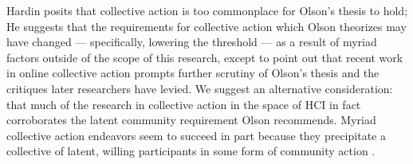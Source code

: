 \documentclass{sigchi-ext}
\begin{document}
Hardin posits that collective action is too commonplace for Olson's thesis to hold;
He suggests that the requirements for collective action which Olson theorizes may have changed
--- specifically, lowering the threshold ---
as a result of myriad factors outside of the scope of this research, except to point out that recent work in online collective action prompts further scrutiny of Olson's thesis and the critiques later researchers have levied.
We suggest an alternative consideration: that much of the research in collective action in the space of HCI in fact corroborates the latent community requirement Olson recommends.
Myriad collective action endeavors seem to succeed in part because they precipitate a collective of latent, willing participants in some form of community action
\cite{catalyst,dynamo,foundry}.

\end{document}
